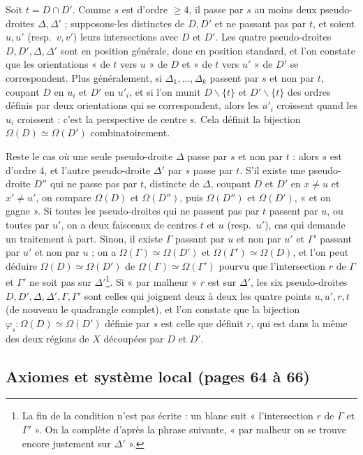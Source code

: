 \documentclass[11pt,a4paper]{article}
\begin{document}
Soit $t = D \cap D'$. Comme $s$ est d'ordre $\geqslant 4$, il passe par $s$
au moins deux pseudo-droites $\Delta, \Delta'$ ; supposons-les distinctes de
$D, D'$ et ne passant pas par $t$, et soient $u, u'$ (resp.\ $v, v'$) leurs
intersections avec $D$ et $D'$. Les quatre pseudo-droites $D, D', \Delta,
\Delta'$ sont en position générale, donc en position standard, et l'on
constate que les orientations « de $t$ vers $u$ » de $D$ et « de $t$ vers
$u'$ » de $D'$ se correspondent. Plus généralement, si $\Delta_1, \ldots,
\Delta_k$ passent par $s$ et non par $t$, coupant $D$ en $u_i$ et $D'$ en
$u'_i$, et si l'on munit $D \smallsetminus \{t\}$ et $D' \smallsetminus \{t\}$
des ordres définis par deux orientations qui se correspondent, alors les
$u'_i$ croissent quand les $u_i$ croissent : c'est la perspective de centre
$s$. Cela définit la bijection $\Omega(D) \simeq \Omega(D')$
combinatoirement.

Reste le cas où une seule pseudo-droite $\Delta$ passe par $s$ et non par
$t$ : alors $s$ est d'ordre $4$, et l'autre pseudo-droite $\Delta'$ par $s$
passe par $t$. S'il existe une pseudo-droite $D''$ qui ne passe pas par $t$,
distincte de $\Delta$, coupant $D$ et $D'$ en $x \neq u$ et $x' \neq u'$, on
compare $\Omega(D)$ et $\Omega(D'')$, puis $\Omega(D'')$ et $\Omega(D')$,
« et on gagne ». Si toutes les pseudo-droites qui ne passent pas par $t$
passent par $u$, ou toutes par $u'$, on a deux faisceaux de centres $t$ et
$u$ (resp.\ $u'$), cas qui demande un traitement à part. Sinon, il existe
$\Gamma$ passant par $u$ et non par $u'$ et $\Gamma'$ passant par $u'$ et non
par $u$ ; on a $\Omega(\Gamma) \simeq \Omega(D')$ et $\Omega(\Gamma') \simeq
\Omega(D)$, et l'on peut déduire $\Omega(D) \simeq \Omega(D')$ de
$\Omega(\Gamma) \simeq \Omega(\Gamma')$ pourvu que l'intersection $r$ de
$\Gamma$ et $\Gamma'$ ne soit pas sur $\Delta'$\footnote{La fin de la
condition n'est pas écrite : un blanc suit « l'intersection $r$ de $\Gamma$
et $\Gamma'$ ». On la complète d'après la phrase suivante, « par malheur on
se trouve encore justement sur $\Delta'$ ».}. Si « par malheur » $r$ est sur
$\Delta'$, les six pseudo-droites $D, D', \Delta, \Delta', \Gamma, \Gamma'$
sont celles qui joignent deux à deux les quatre points $u, u', r, t$ (de
nouveau le quadrangle complet), et l'on constate que la bijection
$\varphi_s : \Omega(D) \simeq \Omega(D')$ définie par $s$ est celle que
définit $r$, qui est dans la même des deux régions de $X$ découpées par $D$
et $D'$.

\subsection*{Axiomes et système local (pages 64 à 66)}
\end{document}
